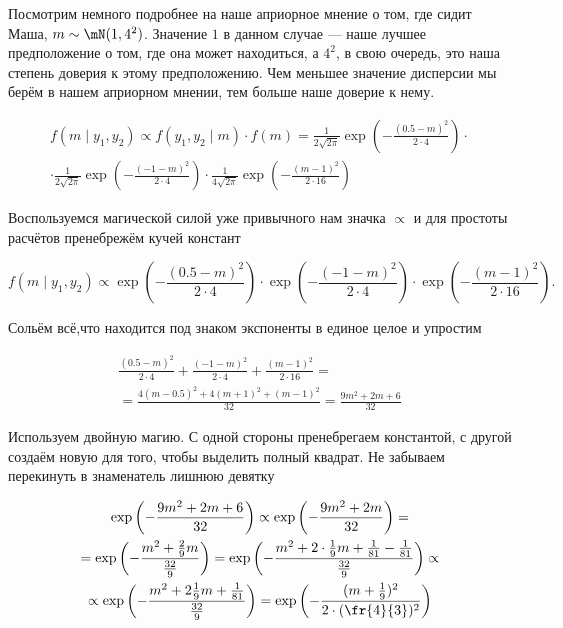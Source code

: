 \documentclass[12pt, a4paper, oneside]{article}
\newcommand{\expp}[1]{ \exp \left( #1 \right)}
\begin{document}
\begin{sol}
Посмотрим немного подробнее на наше априорное мнение о том, где сидит Маша, $m \sim \mN(1, 4^2)$. Значение $1$ в данном случае --- наше лучшее предположение о том, где она может находиться, а $4^2$, в свою очередь, это наша степень доверия к этому предположению. Чем меньшее значение дисперсии мы берём в нашем априорном мнении, тем больше наше доверие к нему.


\begin{multline*}
f(m \mid y_1, y_2) \propto f(y_1,y_2 \mid m) \cdot f(m) = \frac{1}{2\sqrt{2\pi}}\expp{-\frac{(0.5 - m)^2}{2 \cdot 4}} \cdot \\ \cdot \frac{1}{2\sqrt{2\pi}}\expp{-\frac{(-1 - m)^2}{2 \cdot 4}} \cdot \frac{1}{4\sqrt{2\pi}}\expp{-\frac{(m-1)^2}{2 \cdot 16}}
\end{multline*}

Воспользуемся магической силой уже привычного нам значка $\propto$ и для простоты расчётов пренебрежём кучей констант

\[ f(m \mid y_1, y_2) \propto \expp{-\frac{(0.5 - m)^2}{2 \cdot 4}} \cdot \expp{-\frac{(-1 - m)^2}{2 \cdot 4}} \cdot \expp{-\frac{(m-1)^2}{2 \cdot 16}}.\]

Сольём всё,что находится под знаком экспоненты в единое целое и упростим

\begin{multline*}
\frac{(0.5 - m)^2}{2 \cdot 4} + \frac{(-1 - m)^2}{2 \cdot 4} + \frac{(m-1)^2}{2 \cdot 16}  = \\ = \frac{ 4(m - 0.5)^2 + 4(m+1)^2 + (m-1)^2}{32} = \frac{9m^2 + 2m + 6}{32}
\end{multline*}

Используем двойную магию. С одной стороны пренебрегаем константой, с другой создаём новую для того, чтобы выделить полный квадрат. Не забываем перекинуть в знаменатель лишнюю девятку

\begin{multline*}
\expp{-\frac{9m^2 + 2m + 6}{32}} \propto \expp{-\frac{9m^2 + 2m}{32}}  = \\ = \expp{-\frac{m^2+\frac{2}{9} m}{\frac{32}{9}}}  = \expp{-\frac{m^2+ 2 \cdot \frac{1}{9} m + \frac{1}{81} - \frac{1}{81}}{\frac{32}{9}}} \propto  \\ \propto  \expp{-\frac{m^2+ 2 \frac{1}{9} m + \frac{1}{81}}{\frac{32}{9}}} = \expp{-\frac{(m + \frac{1}{9})^2}{2 \cdot (\fr{4}{3})^2}}
\end{multline*}


\end{sol}
\end{document}
